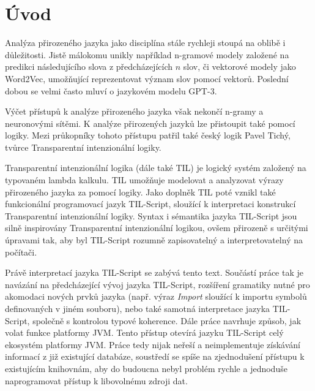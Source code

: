 \chapter{Úvod}
\label{sec:Introduction}

Analýza přirozeného jazyka jako disciplína stále rychleji stoupá na oblibě i důležitosti. Jistě
málokomu unikly například n-gramové modely\cite{ngram-models} založené na predikci následujícího
slova z předcházejících $n$ slov, či vektorové modely jako Word2Vec\cite{word2vec}, umožňující
reprezentovat význam slov pomocí vektorů. Poslední dobou se velmi často mluví o jazykovém modelu
GPT-3\cite{gpt3}.

Výčet přístupů k analýze přirozeného jazyka však nekončí n-gramy a neuronovými sítěmi. K analýze
přirozených jazyků lze přistoupit také pomocí logiky. Mezi průkopníky tohoto přístupu patřil také
český logik Pavel Tichý, tvůrce Transparentní intenzionální logiky.

Transparentní intenzionální logika (dále také TIL) je logický systém založený na typovaném lambda
kalkulu\cite{til-duzi}. TIL umožňuje modelovat a analyzovat výrazy přirozeného jazyka za pomocí
logiky. Jako doplněk TIL poté vznikl také funkcionální programovací jazyk
TIL-Script\cite{til-script}, sloužící k interpretaci konstrukcí Transparentní intenzionální logiky.
Syntax i sémantika jazyka TIL-Script jsou silně inspirovány Transparentní intenzionální logikou,
ovšem přirozeně s určitými úpravami tak, aby byl TIL-Script rozumně zapisovatelný a
interpretovatelný na počítači.

Právě interpretací jazyka TIL-Script se zabývá tento text. Součástí práce tak je navázání
na předcházející vývoj jazyka TIL-Script, rozšíření gramatiky nutné pro akomodaci nových
prvků jazyka (např. výraz \textit{Import} sloužící k importu symbolů definovaných v jiném
souboru), nebo také samotná interpretace jazyka TIL-Script, společně s kontrolou typové koherence.
Dále práce navrhuje způsob, jak volat funkce platformy JVM. Tento přístup otevírá jazyku TIL-Script
celý ekosystém platformy JVM. Práce tedy nijak neřeší a neimplementuje získávání informací
z již existující databáze, soustředí se spíše na zjednodušení přístupu k existujícím knihovnám, aby
do budoucna nebyl problém rychle a jednoduše naprogramovat přístup k libovolnému zdroji dat.

